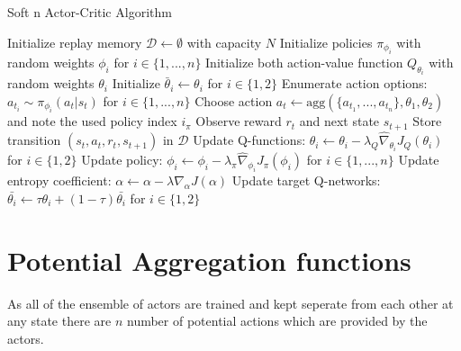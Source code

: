 \documentclass[12pt]{article}
\begin{document}
\begin{algorithm}[H]
\caption{Soft n Actor-Critic Algorithm}
\label{alg:SAC}
\begin{algorithmic}[1]
\State Initialize replay memory $\mathcal{D} \leftarrow \emptyset$ with capacity $N$
\State Initialize policies $\pi_{\phi_i}$ with random weights $\phi_i$ for $i \in \{1, ..., n\}$
\State Initialize both action-value function $Q_{\theta_i}$ with random weights 
$\theta_i$
\State Initialize $\bar{\theta}_{i} \leftarrow \theta_{i}$ for $i \in \{1,2\}$
\Repeat
        \State Enumerate action options: $a_{t_{i}} \sim \pi_{\phi_{i}}(a_{t} | s_{t})$ for $i \in \{1, ... , n\}$
        \State Choose action $a_{t} \gets \text{agg}(\{a_{t_{1}}, ... , a_{t_{n}}\}, {\theta_1, \theta_2})$ and note the used policy index $i_\pi$
        \State Observe reward $r_{t}$ and next state $s_{t+1}$
        \State Store transition $(s_{t}, a_{t}, r_{t}, s_{t+1})$ in $\mathcal{D}$
    \EndFor
        \State Update Q-functions: $\theta_{i} \gets \theta_{i} - \lambda_{Q} \hat{\nabla}_{\theta_{i}} J_{Q}(\theta_{i})$ for $i \in \{1,2\}$
        \State Update policy: $\phi_i \gets \phi_i - \lambda_{\pi} \hat{\nabla}_{\phi_i} J_{\pi}(\phi_i)$ for $i \in \{1,...,n\}$
        \State Update entropy coefficient: $\alpha \gets \alpha - \lambda \hat{\nabla}_{\alpha} J(\alpha)$
        \State Update target Q-networks: $\bar{\theta_{i}} \gets \tau\theta_{i} + (1 - \tau) \bar{\theta_{i}}$ for $i \in \{1,2\}$
    \EndFor
{}

\end{algorithmic}
\end{algorithm}

\section{Potential Aggregation functions}

As all of the ensemble of actors are trained and kept seperate from each other at any state there are $n$ number of potential actions which are provided by the actors.
\end{document}
